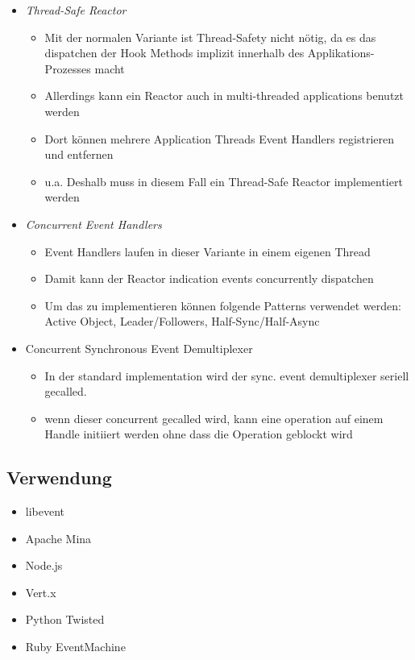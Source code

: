 \begin{itemize}
	\item \emph{Thread-Safe Reactor}
	\begin{itemize}
		\item Mit der normalen Variante ist Thread-Safety nicht nötig, da es das dispatchen der Hook Methods implizit innerhalb des Applikations-Prozesses macht
		\item Allerdings kann ein Reactor auch in multi-threaded applications benutzt werden
		\item Dort können mehrere Application Threads Event Handlers registrieren und entfernen
		\item u.a. Deshalb muss in diesem Fall ein Thread-Safe Reactor implementiert werden
	\end{itemize}
	\item \emph{Concurrent Event Handlers}
	\begin{itemize}
		\item Event Handlers laufen in dieser Variante in einem eigenen Thread
		\item Damit kann der Reactor indication events concurrently dispatchen
		\item Um das zu implementieren können folgende Patterns verwendet werden: Active Object, Leader/Followers, Half-Sync/Half-Async
	\end{itemize}
	\item Concurrent Synchronous Event Demultiplexer
	\begin{itemize}
		\item In der standard implementation wird der sync. event demultiplexer seriell gecalled.
		\item wenn dieser concurrent gecalled wird, kann eine operation auf einem Handle initiiert werden ohne dass die Operation geblockt wird
	\end{itemize}
\end{itemize}


\subsection{Verwendung}
\begin{itemize}
	\item libevent
	\item Apache Mina
	\item Node.js
	\item Vert.x
	\item Python Twisted
	\item Ruby EventMachine
\end{itemize}


